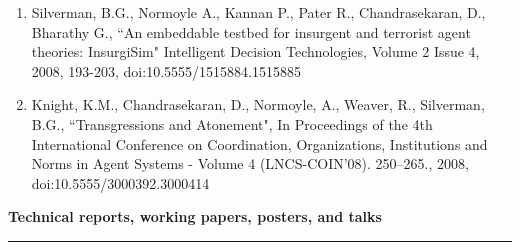 \begin{enumerate}[leftmargin=*]
\item Silverman, B.G., Normoyle A., Kannan P., Pater R., Chandrasekaran, D., Bharathy G., ``An embeddable testbed for insurgent and terrorist agent theories: InsurgiSim" Intelligent Decision Technologies, Volume 2 Issue 4, 2008, 193-203, doi:10.5555/1515884.1515885

\item Knight, K.M., Chandrasekaran, D., Normoyle, A., Weaver, R., Silverman, B.G., ``Transgressions and Atonement", In Proceedings of the 4th International Conference on Coordination, Organizations, Institutions and Norms in Agent Systems - Volume 4 (LNCS-COIN'08). 250–265., 2008, doi:10.5555/3000392.3000414

\end{enumerate}
\medskip
\medskip

{\Large {\bf  Technical reports, working papers, posters, and talks}}
\vspace{0.1cm}
\hrule
\medskip

